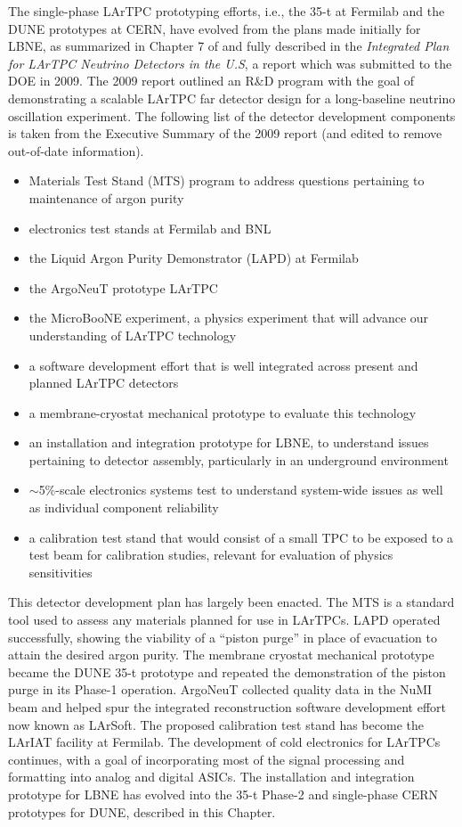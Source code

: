 The single-phase LArTPC prototyping efforts, i.e., the 35-t at
Fermilab and the DUNE prototypes at CERN, have evolved from the plans
made initially for LBNE, as summarized in Chapter 7 of \anxlbnefd{}
and fully described in the \textit{Integrated Plan for LArTPC Neutrino
  Detectors in the U.S}, a report which was submitted to the DOE in
2009.  The 2009 report outlined an R\&D program with the goal of
demonstrating a scalable LArTPC far detector design for a
long-baseline neutrino oscillation experiment.  The following list of
the detector development components is taken from the Executive
Summary of the 2009 report (and edited to remove out-of-date
information).
\begin{itemize}
   \item Materials Test Stand (MTS) program 
   to address questions pertaining to maintenance of argon purity
    \item electronics test stands at Fermilab and BNL
    \item the Liquid Argon Purity Demonstrator (LAPD) at Fermilab
    \item the ArgoNeuT prototype LArTPC 
    \item the MicroBooNE experiment, a physics experiment that will
      advance our understanding of LArTPC technology
    \item a software development effort that is well integrated across
      present and planned LArTPC detectors
    \item a membrane-cryostat mechanical prototype to evaluate this technology
    \item an installation and integration prototype for LBNE, to
      understand issues pertaining to detector assembly, particularly
      in an underground environment
    \item $\sim$5\%-scale electronics systems test to understand
      system-wide issues as well as individual component reliability
    \item a calibration test stand that would consist of a small TPC
      to be exposed to a test beam for calibration studies, relevant
      for evaluation of physics sensitivities
\end{itemize}

This detector development plan has largely been enacted.  The MTS is a
standard tool used to assess any materials planned for use in LArTPCs.
LAPD operated successfully, showing the viability of a ``piston purge'' in
place of evacuation to attain the desired argon purity.  The membrane
cryostat mechanical prototype became the DUNE 35-t prototype and
repeated the demonstration of the piston purge in its Phase-1
operation.  ArgoNeuT collected quality data in the NuMI beam and
helped spur the integrated reconstruction software development effort
now known as LArSoft.  The proposed calibration test stand has become
the LArIAT facility at Fermilab.  The development of cold electronics
for LArTPCs continues, with a goal of incorporating most of the signal
processing and formatting into analog and digital ASICs.  The
installation and integration prototype for LBNE has evolved into the
35-t Phase-2 and single-phase CERN prototypes for DUNE, described
in this Chapter.
 
